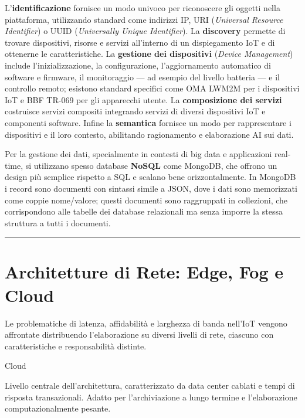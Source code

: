 \documentclass[
  italian,
  openany]{book}
\begin{document}
L'\textbf{identificazione} fornisce un modo univoco per riconoscere gli
oggetti nella piattaforma, utilizzando standard come indirizzi IP, URI
(\emph{Universal Resource Identifier}) o UUID (\emph{Universally Unique
Identifier}). La \textbf{discovery} permette di trovare dispositivi,
risorse e servizi all'interno di un dispiegamento IoT e di ottenerne le
caratteristiche. La \textbf{gestione dei dispositivi} (\emph{Device
Management}) include l'inizializzazione, la configurazione,
l'aggiornamento automatico di software e firmware, il monitoraggio ---
ad esempio del livello batteria --- e il controllo remoto; esistono
standard specifici come OMA LWM2M per i dispositivi IoT e BBF TR-069 per
gli apparecchi utente. La \textbf{composizione dei servizi} costruisce
servizi compositi integrando servizi di diversi dispositivi IoT e
componenti software. Infine la \textbf{semantica} fornisce un modo per
rappresentare i dispositivi e il loro contesto, abilitando ragionamento
e elaborazione AI sui dati.

Per la gestione dei dati, specialmente in contesti di big data e
applicazioni real-time, si utilizzano spesso database \textbf{NoSQL}
come MongoDB, che offrono un design più semplice rispetto a SQL e
scalano bene orizzontalmente. In MongoDB i record sono documenti con
sintassi simile a JSON, dove i dati sono memorizzati come coppie
nome/valore; questi documenti sono raggruppati in collezioni, che
corrispondono alle tabelle dei database relazionali ma senza imporre la
stessa struttura a tutti i documenti.

\begin{center}\rule{0.5\linewidth}{0.5pt}\end{center}

\section{Architetture di Rete: Edge, Fog e
Cloud}\label{architetture-di-rete-edge-fog-e-cloud}

Le problematiche di latenza, affidabilità e larghezza di banda nell'IoT
vengono affrontate distribuendo l'elaborazione su diversi livelli di
rete, ciascuno con caratteristiche e responsabilità distinte.

\begin{calloutdefinition}{Cloud}

Livello centrale dell'architettura, caratterizzato da data center
cablati e tempi di risposta transazionali. Adatto per l'archiviazione a
lungo termine e l'elaborazione computazionalmente pesante.

\end{calloutdefinition}
\end{document}
